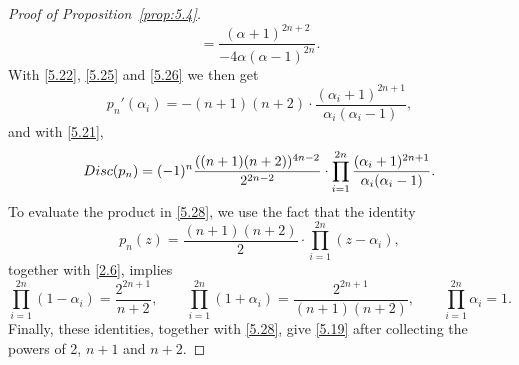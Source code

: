\documentclass[10pt,a4paper]{amsart}
\begin{document}
\begin{proof}[Proof of Proposition~\ref{prop:5.4}]
\begin{equation}
=\frac{(\alpha+1)^{2n+2}}{-4\alpha(\alpha-1)^{2n}}.
\end{equation}
With \eqref{5.22}, \eqref{5.25} and \eqref{5.26} we then get
\[
p_n'(\alpha_i) 
=-(n+1)(n+2)\cdot\frac{(\alpha_i+1)^{2n+1}}{\alpha_i(\alpha_i-1)},
\]
and with \eqref{5.21},
\begin{equation}\label{5.28}
{\rm Disc}(p_n)=(-1)^n \frac{((n+1)(n+2))^{4n-2}}{2^{2n-2}}
\cdot\prod_{i=1}^{2n}\frac{(\alpha_i+1)^{2n+1}}{\alpha_i(\alpha_i-1)}.
\end{equation}
To evaluate the product in \eqref{5.28}, we use the fact that the identity
\[
p_n(z)=\frac{(n+1)(n+2)}{2}\cdot\prod_{i=1}^{2n}(z-\alpha_i),
\]
together with \eqref{2.6}, implies
\[
\prod_{i=1}^{2n}(1-\alpha_i)=\frac{2^{2n+1}}{n+2},\qquad
\prod_{i=1}^{2n}(1+\alpha_i)=\frac{2^{2n+1}}{(n+1)(n+2)},\qquad
\prod_{i=1}^{2n}\alpha_i=1.
\]
Finally, these identities, together with \eqref{5.28}, give \eqref{5.19} after
collecting the powers of 2, $n+1$ and $n+2$.
\end{proof}
\end{document}

